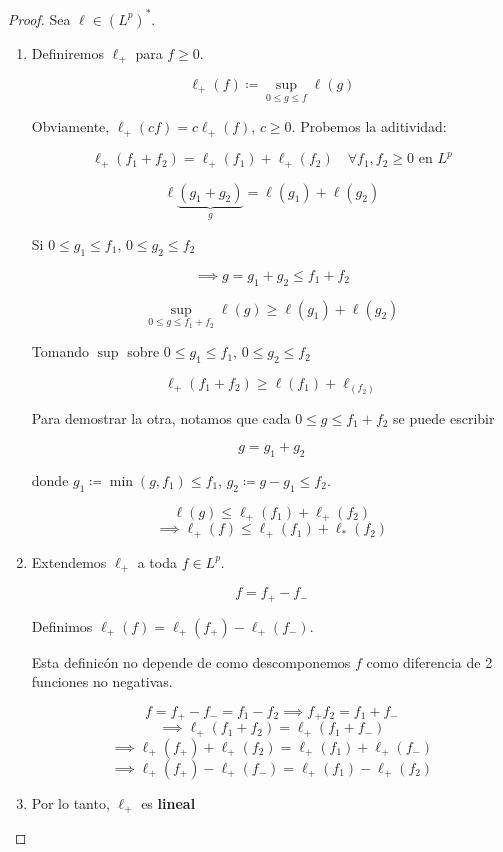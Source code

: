 \begin{proof}
    Sea $\ell\in(L^p)^*$.

    \begin{enumerate}
        \item Definiremos $\ell_+$ para $f\geq 0$.
        
        \[\ell_+(f)\coloneqq \sup_{0\leq g\leq f}\ell(g)\]

        Obviamente, $\ell_{+}(cf)=c\ell_+(f)$, $c\geq 0$. Probemos la aditividad:

        \[\ell_+(f_1+f_2)=\ell_+(f_1)+\ell_+(f_2)\quad\forall f_1,f_2\geq 0\text{ en }L^p\]

        \[\ell\underbrace{(g_1+g_2)}_{g}=\ell(g_1)+\ell(g_2)\]

        Si $0\leq g_1\leq f_1$, $0\leq g_2\leq f_2$

        \[\implies g=g_1+g_2\leq f_1+f_2\]

        \[\sup_{0\leq g\leq f_1+f_2}\ell(g)\geq \ell(g_1)+\ell(g_2)\]

        Tomando $\sup$ sobre $0\leq g_1\leq f_1$, $0\leq g_2\leq f_2$

        \[\ell_+(f_1+f_2)\geq \ell(f_1)+\ell_(f_2)\]

        Para demostrar la otra, notamos que cada $0\leq g\leq f_1+f_2$ se puede escribir

        \[g=g_1+g_2\]

        donde $g_1\coloneqq \min(g,f_1)\leq f_1$, $g_2\coloneqq g-g_1\leq f_2$.

        \[\ell(g)\leq \ell_+(f_1)+\ell_+(f_2)\]
        \[\implies \ell_+(f)\leq \ell_+(f_1)+\ell_*(f_2)\]

        \item Extendemos $\ell_+$ a toda $f\in L^p$.
        
        \[f=f_+-f_-\]

        Definimos $\ell_+(f)=\ell_+(f_+)-\ell_+(f_-)$.

        Esta definicón no depende de como descomponemos $f$ como diferencia de 2 funciones no negativas.

        \[f=f_+-f_-=f_1-f_2\implies f_+f_2=f_1+f_-\]
        \[\implies \ell_+(f_1+f_2)=\ell_+(f_1+f_-)\]
        \[\implies \ell_+(f_+)+\ell_+(f_2)=\ell_+(f_1)+\ell_+(f_-)\]
        \[\implies \ell_+(f_+)-\ell_+(f_-)=\ell_+(f_1)-\ell_+(f_2)\]

        \item Por lo tanto, $\ell_+$ es \textbf{lineal}
        

\end{enumerate}
\end{proof}
